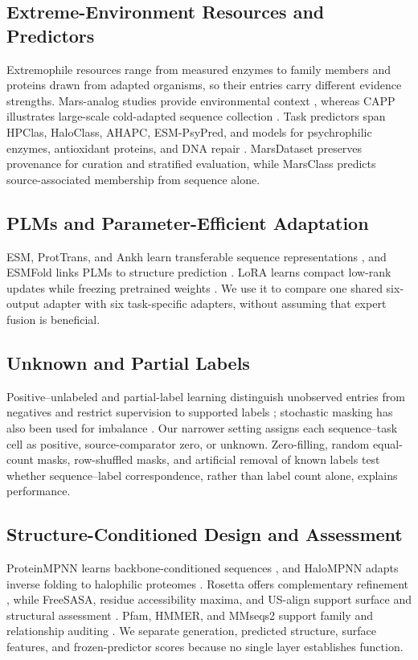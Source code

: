 \documentclass[conference]{IEEEtran}
\begin{document}
\subsection{Extreme-Environment Resources and Predictors}
Extremophile resources range from measured enzymes to family members and proteins drawn from adapted organisms, so their entries carry different evidence strengths. Mars-analog studies provide environmental context \cite{ref14,ref15}, whereas CAPP illustrates large-scale cold-adapted sequence collection \cite{ref31}. Task predictors span HPClas, HaloClass, AHAPC, ESM-PsyPred, and models for psychrophilic enzymes, antioxidant proteins, and DNA repair \cite{ref1,ref18,ref20,ref21,ref19,ref22,ref23,ref24}. MarsDataset preserves provenance for curation and stratified evaluation, while MarsClass predicts source-associated membership from sequence alone.

\subsection{PLMs and Parameter-Efficient Adaptation}
ESM, ProtTrans, and Ankh learn transferable sequence representations \cite{ref16,ref2,ref17}, and ESMFold links PLMs to structure prediction \cite{ref3}. LoRA learns compact low-rank updates while freezing pretrained weights \cite{ref4}. We use it to compare one shared six-output adapter with six task-specific adapters, without assuming that expert fusion is beneficial.

\subsection{Unknown and Partial Labels}
Positive--unlabeled and partial-label learning distinguish unobserved entries from negatives and restrict supervision to supported labels \cite{ref25,ref7}; stochastic masking has also been used for imbalance \cite{ref26}. Our narrower setting assigns each sequence--task cell as positive, source-comparator zero, or unknown. Zero-filling, random equal-count masks, row-shuffled masks, and artificial removal of known labels test whether sequence--label correspondence, rather than label count alone, explains performance.

\subsection{Structure-Conditioned Design and Assessment}
ProteinMPNN learns backbone-conditioned sequences \cite{ref5}, and HaloMPNN adapts inverse folding to halophilic proteomes \cite{ref6}. Rosetta offers complementary refinement \cite{ref27}, while FreeSASA, residue accessibility maxima, and US-align support surface and structural assessment \cite{ref9,ref10,ref11}. Pfam, HMMER, and MMseqs2 support family and relationship auditing \cite{ref28,ref29,ref30}. We separate generation, predicted structure, surface features, and frozen-predictor scores because no single layer establishes function.
\end{document}
